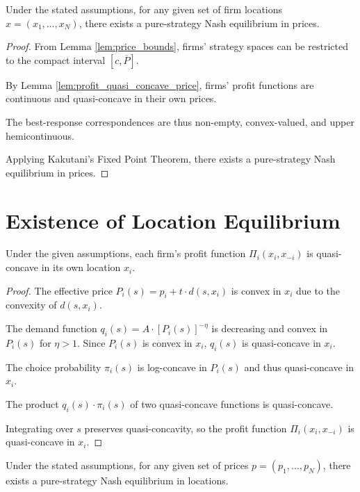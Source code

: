 \begin{proposition}
\label{prop:price_equilibrium}
Under the stated assumptions, for any given set of firm locations \( x = (x_1, \dots, x_N) \), there exists a pure-strategy Nash equilibrium in prices.
\end{proposition}

\begin{proof}
From Lemma \ref{lem:price_bounds}, firms' strategy spaces can be restricted to the compact interval \( [c, \overline{P}] \).

By Lemma \ref{lem:profit_quasi_concave_price}, firms' profit functions are continuous and quasi-concave in their own prices.

The best-response correspondences are thus non-empty, convex-valued, and upper hemicontinuous.

Applying Kakutani's Fixed Point Theorem, there exists a pure-strategy Nash equilibrium in prices.
\end{proof}

\section{Existence of Location Equilibrium}

\begin{lemma}
\label{lem:profit_quasi_concave_location}
Under the given assumptions, each firm's profit function \( \Pi_i(x_i, x_{-i}) \) is quasi-concave in its own location \( x_i \).
\end{lemma}

\begin{proof}
The effective price \( P_i(s) = p_i + t \cdot d(s, x_i) \) is convex in \( x_i \) due to the convexity of \( d(s, x_i) \).

The demand function \( q_i(s) = A \cdot [P_i(s)]^{-\eta} \) is decreasing and convex in \( P_i(s) \) for \( \eta > 1 \). Since \( P_i(s) \) is convex in \( x_i \), \( q_i(s) \) is quasi-concave in \( x_i \).

The choice probability \( \pi_i(s) \) is log-concave in \( P_i(s) \) and thus quasi-concave in \( x_i \).

The product \( q_i(s) \cdot \pi_i(s) \) of two quasi-concave functions is quasi-concave.

Integrating over \( s \) preserves quasi-concavity, so the profit function \( \Pi_i(x_i, x_{-i}) \) is quasi-concave in \( x_i \).
\end{proof}

\begin{proposition}
\label{prop:location_equilibrium}
Under the stated assumptions, for any given set of prices \( p = (p_1, \dots, p_N) \), there exists a pure-strategy Nash equilibrium in locations.
\end{proposition}

